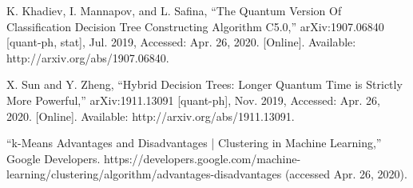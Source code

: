 \documentclass[conference]{IEEEtran}
\begin{document}
\begin{thebibliography}{00}
 K. Khadiev, I. Mannapov, and L. Safina, “The Quantum Version Of Classification Decision Tree Constructing Algorithm C5.0,” arXiv:1907.06840 [quant-ph, stat], Jul. 2019, Accessed: Apr. 26, 2020. [Online]. Available: http://arxiv.org/abs/1907.06840.

 X. Sun and Y. Zheng, “Hybrid Decision Trees: Longer Quantum Time is Strictly More Powerful,” arXiv:1911.13091 [quant-ph], Nov. 2019, Accessed: Apr. 26, 2020. [Online]. Available: http://arxiv.org/abs/1911.13091.

 “k-Means Advantages and Disadvantages | Clustering in Machine Learning,” Google Developers. https://developers.google.com/machine-learning/clustering/algorithm/advantages-disadvantages (accessed Apr. 26, 2020).


\end{thebibliography}
\end{document}
